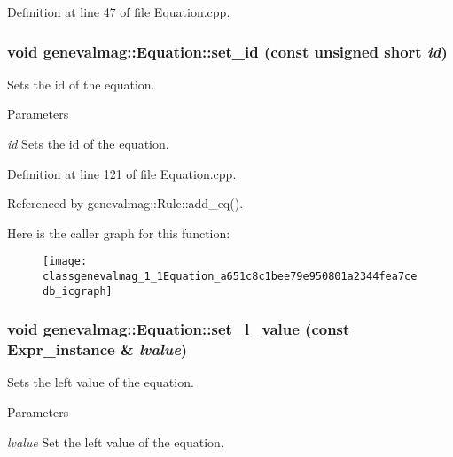 Definition at line 47 of file Equation.cpp.

\hypertarget{classgenevalmag_1_1Equation_a651c8c1bee79e950801a2344fea7cedb}{
\subsubsection[{set\_\-id}]{\setlength{\rightskip}{0pt plus 5cm}void genevalmag::Equation::set\_\-id (const unsigned short {\em id})}}
\label{classgenevalmag_1_1Equation_a651c8c1bee79e950801a2344fea7cedb}
Sets the id of the equation. 
\begin{DoxyParams}{Parameters}
\item[{\em id}]Sets the id of the equation. \end{DoxyParams}


Definition at line 121 of file Equation.cpp.



Referenced by genevalmag::Rule::add\_\-eq().



Here is the caller graph for this function:\nopagebreak
\begin{figure}[H]
\begin{center}
\leavevmode
\texttt{[image: classgenevalmag\_1\_1Equation\_a651c8c1bee79e950801a2344fea7cedb\_icgraph]}
\end{center}
\end{figure}


\hypertarget{classgenevalmag_1_1Equation_a640c6b66f92e52b3554e75f9f9d18243}{
\subsubsection[{set\_\-l\_\-value}]{\setlength{\rightskip}{0pt plus 5cm}void genevalmag::Equation::set\_\-l\_\-value (const {\bf Expr\_\-instance} \& {\em lvalue})}}
\label{classgenevalmag_1_1Equation_a640c6b66f92e52b3554e75f9f9d18243}
Sets the left value of the equation. 
\begin{DoxyParams}{Parameters}
\item[{\em lvalue}]Set the left value of the equation. \end{DoxyParams}


